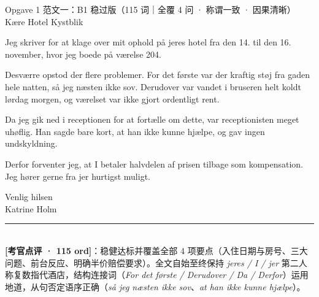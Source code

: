 \begin{emailbox}{Opgave 1 范文一：B1 稳过版（115 词｜全覆 4 问 · 称谓一致 · 因果清晰）}
Kære Hotel Kystblik

Jeg skriver for at klage over mit ophold på jeres hotel fra den 14. til den 16. november, hvor jeg boede på værelse 204.

Desværre opstod der flere problemer. For det første var der kraftig støj fra gaden hele natten, så jeg næsten ikke sov. Derudover var vandet i bruseren helt koldt lørdag morgen, og værelset var ikke gjort ordentligt rent.

Da jeg gik ned i receptionen for at fortælle om dette, var receptionisten meget uhøflig. Han sagde bare kort, at han ikke kunne hjælpe, og gav ingen undskyldning.

Derfor forventer jeg, at I betaler halvdelen af prisen tilbage som kompensation. Jeg hører gerne fra jer hurtigst muligt.

Venlig hilsen\\
Katrine Holm

\vspace{0.3em}
\rule{\linewidth}{0.4pt}\\[0.2em]
\small\textbf{\color{NCDTeal}[考官点评 · 115 ord]}：稳健达标并覆盖全部 4 项要点（入住日期与房号、三大问题、前台反应、明确半价赔偿要求）。全文自始至终保持 \textit{jeres / I / jer} 第二人称复数指代酒店，结构连接词（\textit{For det første / Derudover / Da / Derfor}）运用地道，从句否定语序正确（\textit{så jeg næsten ikke sov}、\textit{at han ikke kunne hjælpe}）。
\end{emailbox}


